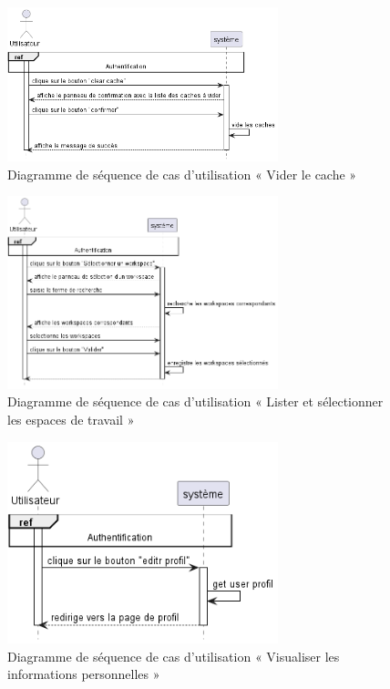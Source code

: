 \begin{figure}[H]
  \centering
  \includegraphics[width=0.7\textwidth]{out/diagrams/sprint6/clear_cache/clear_cache}
  \caption{Diagramme de séquence de cas d'utilisation « Vider le cache »}
  \label{fig:sequence_clear_cache}
\end{figure}

\begin{figure}[H]
  \centering
  \includegraphics[width=0.7\textwidth]{out/diagrams/sprint6/lister_selectionner_workspaces/lister_selectionner_workspaces}
  \caption{Diagramme de séquence de cas d'utilisation « Lister et sélectionner les espaces de travail »}
  \label{fig:sequence_lister_selectionner_workspaces}
\end{figure}

\begin{figure}[H]
  \centering
  \includegraphics[width=0.7\textwidth]{out/diagrams/sprint6/visualiser_profil/visualiser_profil}
  \caption{Diagramme de séquence de cas d'utilisation « Visualiser les informations personnelles »}
  \label{fig:sequence_visualiser_profil}
\end{figure}

